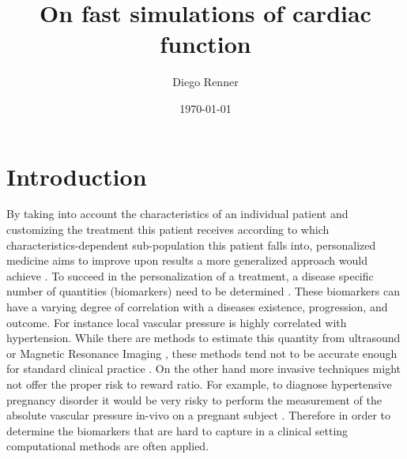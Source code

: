 \documentclass[a4paper, oneside]{discothesis}
\title{On fast simulations of cardiac function}
\author{Diego Renner}
\institute{Dep. of Mathematics \\[2pt]
ETH Zürich}
\date{\today}
\begin{document}
\frontmatter %
\maketitle
\cleardoublepage

\begin{acknowledgements}
	
\end{acknowledgements}


\begin{abstract}
	
\end{abstract}

\tableofcontents

\mainmatter %

\chapter{Introduction}

By taking into account the characteristics of an individual patient and customizing the treatment this patient receives according to which characteristics-dependent sub-population this patient falls into, personalized medicine aims to improve upon results a more generalized approach would achieve \cite{ashley2016towards,national2011toward,giardino2017role}.
To succeed in the personalization of a treatment, a disease specific number of quantities (biomarkers) need to be determined \cite{burke1998integrating}.
These biomarkers can have a varying degree of correlation with a diseases existence, progression, and outcome.
For instance local vascular pressure is highly correlated with hypertension.
While there are methods to estimate this quantity from ultrasound or Magnetic Resonance Imaging \cite{markl20124d}, these methods tend not to be accurate enough for standard clinical practice \cite{everett2012beyond}.
On the other hand more invasive techniques might not offer the proper risk to reward ratio.
For example, to diagnose hypertensive pregnancy disorder it would be very risky to perform the measurement of the absolute vascular pressure in-vivo on a pregnant subject \cite{kett2002adverse}.
Therefore in order to determine the biomarkers that are hard to capture in a clinical setting computational methods are often applied.
\end{document}
